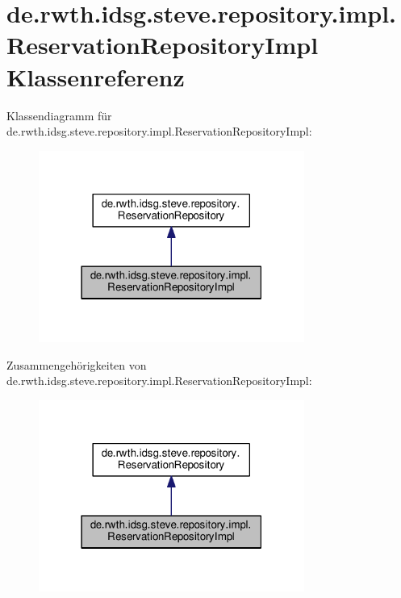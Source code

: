\hypertarget{classde_1_1rwth_1_1idsg_1_1steve_1_1repository_1_1impl_1_1_reservation_repository_impl}{\section{de.\+rwth.\+idsg.\+steve.\+repository.\+impl.\+Reservation\+Repository\+Impl Klassenreferenz}
\label{classde_1_1rwth_1_1idsg_1_1steve_1_1repository_1_1impl_1_1_reservation_repository_impl}
}


Klassendiagramm für de.\+rwth.\+idsg.\+steve.\+repository.\+impl.\+Reservation\+Repository\+Impl\+:\nopagebreak
\begin{figure}[H]
\begin{center}
\leavevmode
\includegraphics[width=247pt]{classde_1_1rwth_1_1idsg_1_1steve_1_1repository_1_1impl_1_1_reservation_repository_impl__inherit__graph}
\end{center}
\end{figure}


Zusammengehörigkeiten von de.\+rwth.\+idsg.\+steve.\+repository.\+impl.\+Reservation\+Repository\+Impl\+:\nopagebreak
\begin{figure}[H]
\begin{center}
\leavevmode
\includegraphics[width=247pt]{classde_1_1rwth_1_1idsg_1_1steve_1_1repository_1_1impl_1_1_reservation_repository_impl__coll__graph}
\end{center}
\end{figure}
